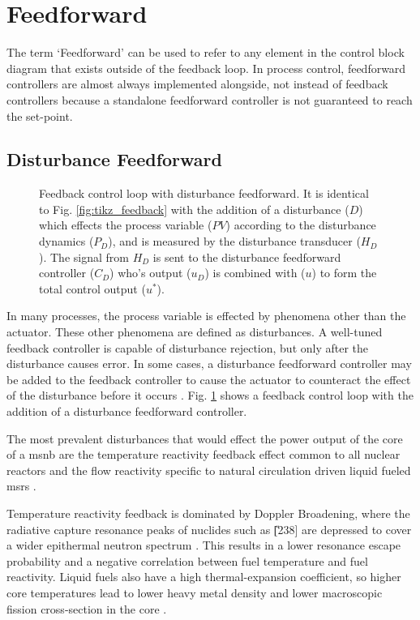 \section{Feedforward}
The term `Feedforward' can be used to refer to any element in the control block diagram that exists outside of the feedback loop. In process control, feedforward controllers are almost always implemented alongside, not instead of feedback controllers because a standalone feedforward controller is not guaranteed to reach the set-point.  

\subsection{Disturbance Feedforward}
\begin{figure}[!ht]
    \centering
    
    \caption[Feedback control loop with disturbance feedforward]{Feedback control loop with disturbance feedforward. It is identical to Fig. \ref{fig:tikz_feedback} with the addition of a disturbance ($D$) which effects the process variable ($PV$) according to the disturbance dynamics ($P_D$), and is measured by the disturbance transducer ($H_D$). The signal from $H_D$ is sent to the disturbance feedforward controller ($C_D$) who's output ($u_D$) is combined with ($u$) to form the total control output ($u^*$).}
    \label{fig:tikz_feedforward}
\end{figure}

In many processes, the process variable is effected by phenomena other than the actuator. These other phenomena are defined as disturbances. A well-tuned feedback controller is capable of disturbance rejection, but only after the disturbance causes error. In some cases, a disturbance feedforward controller may be added to the feedback controller to cause the actuator to counteract the effect of the disturbance before it occurs \cite[Ch. 10]{Bequette}. Fig. \ref{fig:tikz_feedforward} shows a feedback control loop with the addition of a disturbance feedforward controller.

The most prevalent disturbances that would effect the power output of the core of a \acs{msnb} are the temperature reactivity feedback effect common to all nuclear reactors and the flow reactivity specific to natural circulation driven  liquid fueled \acsp{msr} \cite{CarterNumerical}. 

Temperature reactivity feedback is dominated by Doppler Broadening, where the radiative capture resonance peaks of nuclides such as \U[238] are depressed to cover a wider epithermal neutron spectrum \cite[Ch. 2]{DH}. This results in a lower resonance escape probability \cite[Ch. 3]{DH} and a negative correlation between fuel temperature and fuel reactivity. Liquid fuels also have a high thermal-expansion coefficient, so higher core temperatures lead to lower heavy metal density and lower macroscopic fission cross-section in the core \cite{PetersonMS}.

